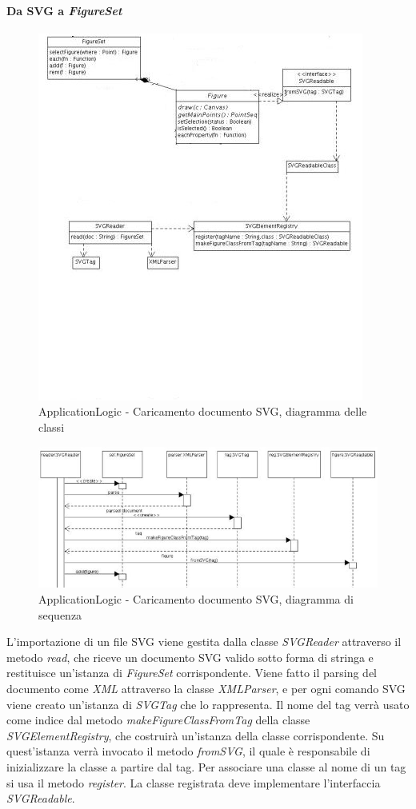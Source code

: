 \paragraph{Da SVG a \textit{FigureSet}}

\begin{figure}[!ht]
\centering
\includegraphics{ClassiLetturaSVG.jpg}
\caption{ApplicationLogic - Caricamento documento SVG, diagramma delle classi}
\end{figure}

\begin{figure}[!ht]
\centering
\includegraphics{LetturaSVG.jpg}
\caption{ApplicationLogic - Caricamento documento SVG, diagramma di sequenza}
\end{figure}

L'importazione di un file SVG viene gestita dalla classe \textit{SVGReader} attraverso il metodo \textit{read}, che riceve un documento SVG valido sotto forma di stringa e restituisce un'istanza di \textit{FigureSet} corrispondente. Viene fatto il parsing del documento come \textit{XML} attraverso la classe \textit{XMLParser}, e per ogni comando SVG viene creato un'istanza di \textit{SVGTag} che lo rappresenta. Il nome del tag verr\`a usato come indice dal metodo \textit{makeFigureClassFromTag} della classe \textit{SVGElementRegistry}, che costruir\`a un'istanza della classe corrispondente. Su quest'istanza verr\`a invocato il metodo \textit{fromSVG}, il quale \`e responsabile di inizializzare la classe a partire dal tag. Per associare una classe al nome di un tag si usa il metodo \textit{register}. La classe registrata deve implementare l'interfaccia \textit{SVGReadable}.

